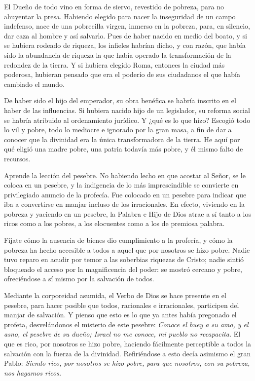 \documentclass[]{article}
\begin{document}
El Dueño de todo vino en forma de siervo, revestido de pobreza, para no
ahuyentar la presa. Habiendo elegido para nacer la inseguridad de un
campo indefenso, nace de una pobrecilla virgen, inmerso en la pobreza,
para, en silencio, dar caza al hombre y así salvarlo. Pues de haber
nacido en medio del boato, y si se hubiera rodeado de riqueza, los
infieles habrían dicho, y con razón, que había sido la abundancia de
riqueza la que había operado la transformación de la redondez de la
tierra. Y si hubiera elegido Roma, entonces la ciudad más poderosa,
hubieran pensado que era el poderío de sus ciudadanos el que había
cambiado el mundo.

De haber sido el hijo del emperador, su obra benéfica se habría inscrito
en el haber de las influencias. Si hubiera nacido hijo de un legislador,
su reforma social se habría atribuido al ordenamiento jurídico. Y ¿qué
es lo que hizo? Escogió todo lo vil y pobre, todo lo mediocre e ignorado
por la gran masa, a fin de dar a conocer que la divinidad era la única
transformadora de la tierra. He aquí por qué eligió una madre pobre, una
patria todavía más pobre, y él mismo falto de recursos.

Aprende la lección del pesebre. No habiendo lecho en que acostar al
Señor, se le coloca en un pesebre, y la indigencia de lo más
imprescindible se convierte en privilegiado anuncio de la profecía. Fue
colocado en un pesebre para indicar que iba a convertirse en manjar
incluso de los irracionales. En efecto, viviendo en la pobreza y
yaciendo en un pesebre, la Palabra e Hijo de Dios atrae a sí tanto a los
ricos como a los pobres, a los elocuentes como a los de premiosa
palabra.

Fíjate cómo la ausencia de bienes dio cumplimiento a la profecía, y cómo
la pobreza ha hecho accesible a todos a aquel que por nosotros se hizo
pobre. Nadie tuvo reparo en acudir por temor a las soberbias riquezas de
Cristo; nadie sintió bloqueado el acceso por la magnificencia del poder:
se mostró cercano y pobre, ofreciéndose a sí mismo por la salvación de
todos.

Mediante la corporeidad asumida, el Verbo de Dios se hace presente en el
pesebre, para hacer posible que todos, racionales e irracionales,
participen del manjar de salvación. Y pienso que esto es lo que ya antes
había pregonado el profeta, desvelándonos el misterio de este pesebre:
\emph{Conoce el buey a su amo, y el asno, el pesebre de su dueño; Israel
no me conoce, mi pueblo no recapacita.} El que es rico, por nosotros se
hizo pobre, haciendo fácilmente perceptible a todos la salvación con la
fuerza de la divinidad. Refiriéndose a esto decía asimismo el gran
Pablo: \emph{Siendo rico, por nosotros se hizo pobre, para que nosotros,
con su pobreza, nos hagamos ricos.}
\end{document}
